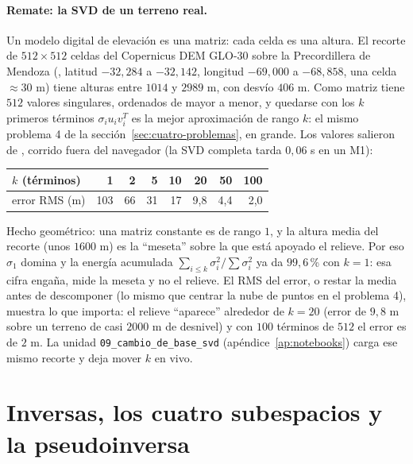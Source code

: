 \paragraph{Remate: la SVD de un terreno real.} Un modelo digital de elevación es una
matriz: cada celda es una altura. El recorte de \(512\times512\) celdas del Copernicus DEM
GLO-30 sobre la Precordillera de Mendoza (, latitud
\(-32{,}284\) a \(-32{,}142\), longitud \(-69{,}000\) a \(-68{,}858\), una celda
\(\approx30\) m) tiene alturas entre \(1014\) y \(2989\) m, con desvío \(406\) m. Como
matriz tiene \(512\) valores singulares, ordenados de mayor a menor, y quedarse con los
\(k\) primeros términos \(\sigma_iu_iv_i^T\) es la mejor aproximación de rango \(k\): el
mismo problema 4 de la sección~\ref{sec:cuatro-problemas}, en grande. Los valores salieron
de , corrido fuera del navegador (la SVD completa tarda
\(0{,}06\) s en un M1):

{\small
\begin{center}
\begin{tabular}{l rrrrrrr}
\toprule
\(k\) (términos) & 1 & 2 & 5 & 10 & 20 & 50 & 100\\
\midrule
error RMS (m) & 103 & 66 & 31 & 17 & 9{,}8 & 4{,}4 & 2{,}0\\
\bottomrule
\end{tabular}
\end{center}
}

Hecho geométrico: una matriz constante es de rango \(1\), y la altura media del recorte
(unos \(1600\) m) es la ``meseta'' sobre la que está apoyado el relieve. Por eso
\(\sigma_1\) domina y la energía acumulada \(\sum_{i\le k}\sigma_i^2/\sum\sigma_i^2\) ya
da \(99{,}6\)\,\% con \(k=1\): esa cifra engaña, mide la meseta y no el relieve. El RMS
del error, o restar la media antes de descomponer (lo mismo que centrar la nube de puntos
en el problema 4), muestra lo que importa: el relieve ``aparece'' alrededor de \(k=20\)
(error de \(9{,}8\) m sobre un terreno de casi \(2000\) m de desnivel) y con \(100\)
términos de \(512\) el error es de \(2\) m. La unidad \texttt{09\_cambio\_de\_base\_svd}
(apéndice~\ref{ap:notebooks}) carga ese mismo recorte y deja mover \(k\) en vivo.

\section{Inversas, los cuatro subespacios y la pseudoinversa}\label{sec:pseudoinversa}

